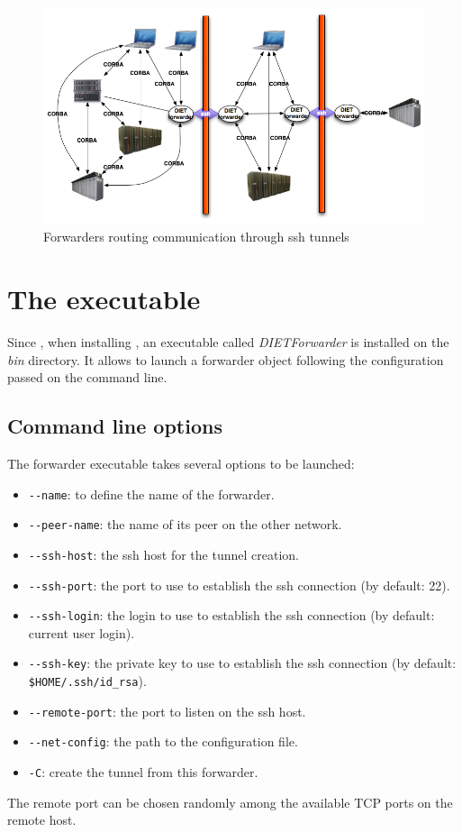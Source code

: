 \begin{figure}[htp]
\begin{center}
  \includegraphics[width=12cm]{fig/Forwarder}
\end{center}
\caption{Forwarders routing \diet communication through ssh tunnels
  \label{fig:forwarder}}
\end{figure}

\section{The \dietforwarder executable}
\label{sec:ForwarderConfig}
Since , when installing \diet, an executable called \textit{DIETForwarder}
is installed on the \textit{bin} directory. It allows to launch a
forwarder object following the configuration passed on the command
line.
\subsection{Command line options}
The \diet forwarder executable takes several options to be launched:
\begin{itemize}
\item \verb#--name#: to define the name of the forwarder.
\item \verb#--peer-name#: the name of its peer on the other network.
\item \verb#--ssh-host#: the ssh host for the tunnel creation.
\item \verb#--ssh-port#: the port to use to establish the ssh
  connection (by default: 22).
\item \verb#--ssh-login#: the login to use to establish the ssh
  connection (by default: current user login).
\item \verb#--ssh-key#: the private key to use to establish the ssh
  connection (by default: \verb#$HOME/.ssh/id_rsa#).
\item \verb#--remote-port#: the port to listen on the ssh host.
\item \verb#--net-config#: the path to the configuration file.
\item \verb#-C#: create the tunnel from this forwarder.
\end{itemize}
The remote port can be chosen randomly among the available TCP ports
on the remote host.\\

